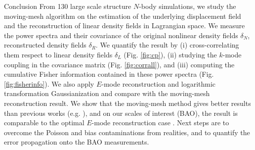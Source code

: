 \begin{section}{Conclusion}
  \label{sec:conclusion}
  From 130 large scale structure $N$-body simulations, 
  we study the moving-mesh algorithm on the estimation of the underlying displacement
  field and the reconstruction of linear density fields in Lagrangian
  space. We measure the power spectra and their covariance of
  the original nonlinear density fields $\delta_N$, reconstructed density fields $\delta_R$.
  We quantify the result by (i) cross-correlating them respect to linear density fields $\delta_L$ (Fig. \ref{fig:cp}),
  (ii) studying the $k$-mode coupling in the covariance matrix (Fig. \ref{fig:corrall}), and (iii)
  computing the cumulative Fisher information contained
  in these power spectra (Fig. \ref{fig:fisherinfo}). We also apply $E$-mode reconstruction
  and logarithmic transformation Gaussianization and compare
  with the moving-mesh reconstruction result. We show
  that the moving-mesh method gives better results than previous works
  (e.g. \cite{bib:Mark2006,bib:Mark2009,bib:Zhang2011,bib:HarnoisD2013}),
  and on our scales of interest (BAO), the result is comparable to
  the optimal $E$-mode reconstruction case \citep{bib:Yu2016}.
  Next steps are to overcome the Poisson and bias contaminations
  from realities, and to quantify the error propagation onto
  the BAO measurements.

\end{section}

